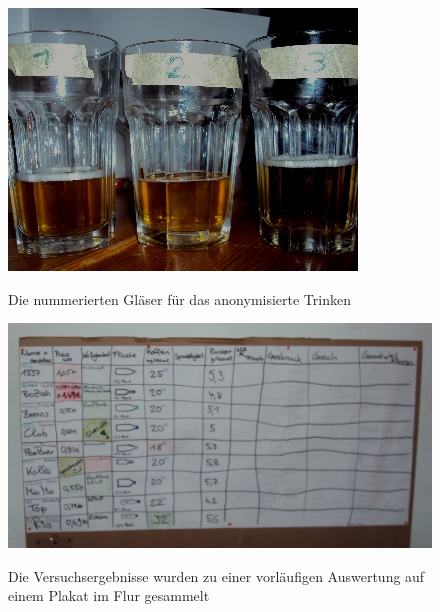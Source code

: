 \documentclass[11pt,a4paper,ngerman]{article}
\begin{document}
\begin{figure}[hb]
 \centering
 \caption{Die nummerierten Gläser für das anonymisierte Trinken}
 \includegraphics{./Fotos/Glaeser.jpg}
 \label{fig:glaeser}
\end{figure}

\begin{figure}[hb]
 \centering
 \caption{Die Versuchsergebnisse wurden zu einer vorläufigen Auswertung auf einem Plakat im Flur gesammelt}
 \includegraphics[width=\textwidth]{./Fotos/plakat.jpg}
 \label{fig:plakat}
\end{figure}
\end{document}
